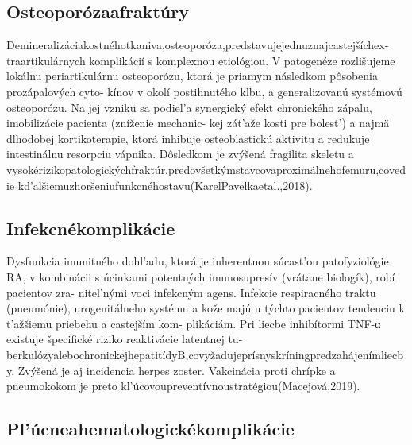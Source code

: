 \subsection{Osteoporózaafraktúry}

Demineralizáciakostnéhotkaniva,osteoporóza,predstavujejednuznajcastejšíchex- traartikulárnych komplikácií s komplexnou etiológiou. V patogenéze rozlišujeme lokálnu periartikulárnu osteoporózu, ktorá je priamym následkom pôsobenia prozápalových cyto- kínov v okolí postihnutého klbu, a generalizovanú systémovú osteoporózu. Na jej vzniku sa podiel’a synergický efekt chronického zápalu, imobilizácie pacienta (zníženie mechanic- kej zát’aže kosti pre bolest’) a najmä dlhodobej kortikoterapie, ktorá inhibuje osteoblastickú aktivitu a redukuje intestinálnu resorpciu vápnika. Dôsledkom je zvýšená fragilita skeletu a vysokérizikopatologickýchfraktúr,predovšetkýmstavcovaproximálnehofemuru,covedie kd’alšiemuzhoršeniufunkcnéhostavu(KarelPavelkaetal.,2018).


\subsection{Infekcnékomplikácie}

Dysfunkcia imunitného dohl’adu, ktorá je inherentnou súcast’ou patofyziológie RA, v kombinácii s úcinkami potentných imunosupresív (vrátane biologík), robí pacientov zra- nitel’nými voci infekcným agens. Infekcie respiracného traktu (pneumónie), urogenitálneho systému a kože majú u týchto pacientov tendenciu k t’ažšiemu priebehu a castejším kom- plikáciám. Pri liecbe inhibítormi TNF-α existuje špecifické riziko reaktivácie latentnej tu- berkulózyalebochronickejhepatitídyB,covyžadujeprísnyskríningpredzahájenímliecby. Zvýšená je aj incidencia herpes zoster. Vakcinácia proti chrípke a pneumokokom je preto kl’úcovoupreventívnoustratégiou(Macejová,2019).


\subsection{Pl’úcneahematologickékomplikácie}

